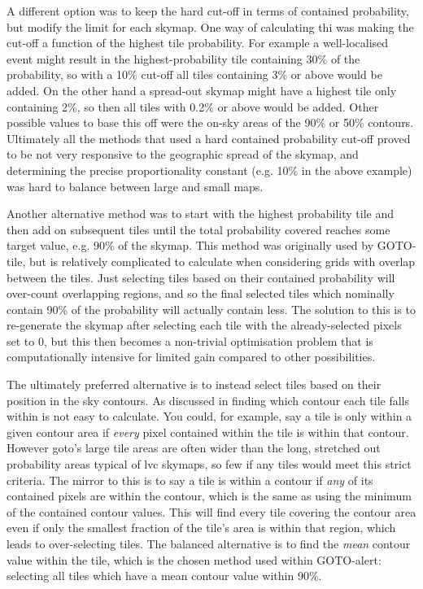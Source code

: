 \begin{colsection}
\begin{colsection}
A different option was to keep the hard cut-off in terms of contained probability, but modify the limit for each skymap. One way of calculating thi was making the cut-off a function of the highest tile probability. For example a well-localised event might result in the highest-probability tile containing $30\%$ of the probability, so with a 10\% cut-off all tiles containing 3\% or above would be added. On the other hand a spread-out skymap might have a highest tile only containing 2\%, so then all tiles with 0.2\% or above would be added. Other possible values to base this off were the on-sky areas of the 90\% or 50\% contours. Ultimately all the methods that used a hard contained probability cut-off proved to be not very responsive to the geographic spread of the skymap, and determining the precise proportionality constant (e.g. 10\% in the above example) was hard to balance between large and small maps.

Another alternative method was to start with the highest probability tile and then add on subsequent tiles until the total probability covered reaches some target value, e.g. 90\% of the skymap. This method was originally used by GOTO-tile, but is relatively complicated to calculate when considering grids with overlap between the tiles. Just selecting tiles based on their contained probability will over-count overlapping regions, and so the final selected tiles which nominally contain 90\% of the probability will actually contain less. The solution to this is to re-generate the skymap after selecting each tile with the already-selected pixels set to 0, but this then becomes a non-trivial optimisation problem that is computationally intensive for limited gain compared to other possibilities.

The ultimately preferred alternative is to instead select tiles based on their position in the sky contours. As discussed in  finding which contour each tile falls within is not easy to calculate. You could, for example, say a tile is only within a given contour area if \textit{every} pixel contained within the tile is within that contour. However \gls{goto}'s large tile areas are often wider than the long, stretched out probability areas typical of \gls{lvc} skymaps, so few if any tiles would meet this strict criteria. The mirror to this is to say a tile is within a contour if \textit{any} of its contained pixels are within the contour, which is the same as using the minimum of the contained contour values. This will find every tile covering the contour area even if only the smallest fraction of the tile's area is within that region, which leads to over-selecting tiles. The balanced alternative is to find the \textit{mean} contour value within the tile, which is the chosen method used within GOTO-alert: selecting all tiles which have a mean contour value within 90\%.


\end{colsection}
\end{colsection}
